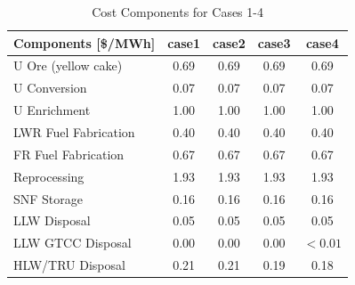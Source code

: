 \begin{table}[htbp]
\begin{center}
\caption{Cost Components for Cases 1-4}
\label{ses_table13_}
\begin{tabular}{|l|c|c|c|c|}
\hline
\textbf{Components [\$/MWh]} & \textbf{case1} & \textbf{case2} & \textbf{case3} & \textbf{case4} \\
\hline
U Ore (yellow cake)          & 0.69            & 0.69            & 0.69            & 0.69 \\
U Conversion                 & 0.07            & 0.07            & 0.07            & 0.07 \\
U Enrichment                 & 1.00            & 1.00            & 1.00            & 1.00 \\
LWR Fuel Fabrication         & 0.40            & 0.40            & 0.40            & 0.40 \\
FR Fuel Fabrication          & 0.67            & 0.67            & 0.67            & 0.67 \\
Reprocessing                 & 1.93            & 1.93            & 1.93            & 1.93 \\
SNF Storage                  & 0.16            & 0.16            & 0.16            & 0.16 \\
LLW Disposal                 & 0.05            & 0.05            & 0.05            & 0.05 \\
LLW GTCC Disposal            & 0.00            & 0.00            & 0.00            & $<0.01$ \\
HLW/TRU Disposal             & 0.21            & 0.21            & 0.19            & 0.18 \\
\hline
\end{tabular}
\end{center}
\end{table}


